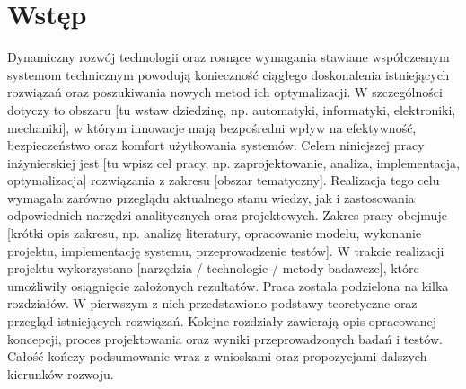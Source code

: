 \chapter{Wstęp}
\label{ch:wstep}

Dynamiczny rozwój technologii oraz rosnące wymagania stawiane współczesnym systemom technicznym powodują konieczność ciągłego doskonalenia istniejących rozwiązań oraz poszukiwania nowych metod ich optymalizacji. W szczególności dotyczy to obszaru [tu wstaw dziedzinę, np. automatyki, informatyki, elektroniki, mechaniki], w którym innowacje mają bezpośredni wpływ na efektywność, bezpieczeństwo oraz komfort użytkowania systemów.
Celem niniejszej pracy inżynierskiej jest [tu wpisz cel pracy, np. zaprojektowanie, analiza, implementacja, optymalizacja] rozwiązania z zakresu [obszar tematyczny]. Realizacja tego celu wymagała zarówno przeglądu aktualnego stanu wiedzy, jak i zastosowania odpowiednich narzędzi analitycznych oraz projektowych.
Zakres pracy obejmuje [krótki opis zakresu, np. analizę literatury, opracowanie modelu, wykonanie projektu, implementację systemu, przeprowadzenie testów]. W trakcie realizacji projektu wykorzystano [narzędzia / technologie / metody badawcze], które umożliwiły osiągnięcie założonych rezultatów.
Praca została podzielona na kilka rozdziałów. W pierwszym z nich przedstawiono podstawy teoretyczne oraz przegląd istniejących rozwiązań. Kolejne rozdziały zawierają opis opracowanej koncepcji, proces projektowania oraz wyniki przeprowadzonych badań i testów. Całość kończy podsumowanie wraz z wnioskami oraz propozycjami dalszych kierunków rozwoju.